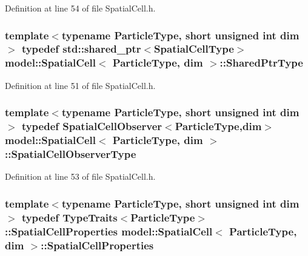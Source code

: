 Definition at line 54 of file Spatial\+Cell.\+h.

\hypertarget{structmodel_1_1_spatial_cell_a56a68d3fd3cfc47cf95d633b12015dc6}{}
\subsubsection[{Shared\+Ptr\+Type}]{\setlength{\rightskip}{0pt plus 5cm}template$<$typename Particle\+Type, short unsigned int dim$>$ typedef std\+::shared\+\_\+ptr$<${\bf Spatial\+Cell\+Type}$>$ {\bf model\+::\+Spatial\+Cell}$<$ Particle\+Type, {\bf dim} $>$\+::{\bf Shared\+Ptr\+Type}}\label{structmodel_1_1_spatial_cell_a56a68d3fd3cfc47cf95d633b12015dc6}


Definition at line 51 of file Spatial\+Cell.\+h.

\hypertarget{structmodel_1_1_spatial_cell_a49c66deddb4da22e03f44027d5464660}{}
\subsubsection[{Spatial\+Cell\+Observer\+Type}]{\setlength{\rightskip}{0pt plus 5cm}template$<$typename Particle\+Type, short unsigned int dim$>$ typedef {\bf Spatial\+Cell\+Observer}$<$Particle\+Type,{\bf dim}$>$ {\bf model\+::\+Spatial\+Cell}$<$ Particle\+Type, {\bf dim} $>$\+::{\bf Spatial\+Cell\+Observer\+Type}}\label{structmodel_1_1_spatial_cell_a49c66deddb4da22e03f44027d5464660}


Definition at line 53 of file Spatial\+Cell.\+h.

\hypertarget{structmodel_1_1_spatial_cell_ad6f145a54655710a13a468cec1e0ff7a}{}
\subsubsection[{Spatial\+Cell\+Properties}]{\setlength{\rightskip}{0pt plus 5cm}template$<$typename Particle\+Type, short unsigned int dim$>$ typedef {\bf Type\+Traits}$<$Particle\+Type$>$\+::{\bf Spatial\+Cell\+Properties} {\bf model\+::\+Spatial\+Cell}$<$ Particle\+Type, {\bf dim} $>$\+::{\bf Spatial\+Cell\+Properties}}\label{structmodel_1_1_spatial_cell_ad6f145a54655710a13a468cec1e0ff7a}


